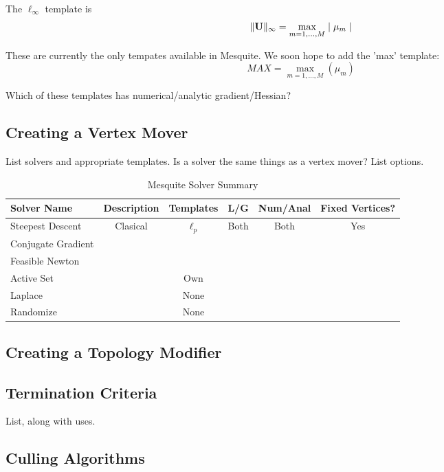 \documentclass[psfig]{article}
\begin{document}
 \newline
The $\ell_{\infty}$ template is
\begin{equation}
\| {\bf U} \|_{\infty} = \max_{m=1,\ldots,M} \mid \mu_m \mid
\end{equation}

These are currently the only tempates available in Mesquite.
We soon hope to add the 'max' template:
\begin{equation}
MAX = \max_{m=1,\ldots,M} ( \mu_m )
\end{equation}

Which of these templates has numerical/analytic gradient/Hessian?

\subsection{Creating a Vertex Mover}
List solvers and appropriate templates. Is a solver the same things as a 
vertex mover? List options.

\begin{table}[h]
\begin{center}
\begin{tabular}{|l|c|c|c|c|c|}
\hline
Solver Name & Description & Templates & L/G & Num/Anal & Fixed Vertices? \\ \hline
Steepest Descent & Clasical & $\ell_p$ & Both & Both & Yes \\
Conjugate Gradient & & & & & \\
Feasible Newton & & & & & \\
Active Set & & Own & & & \\
Laplace & & None & & & \\
Randomize & & None & & & \\
\hline
\end{tabular}
\caption{\label{Solvers} Mesquite Solver Summary}
\end{center}
\end{table}


\subsection{Creating a Topology Modifier}

\subsection{Termination Criteria}
List, along with uses.

\subsection{Culling Algorithms}
\end{document}
